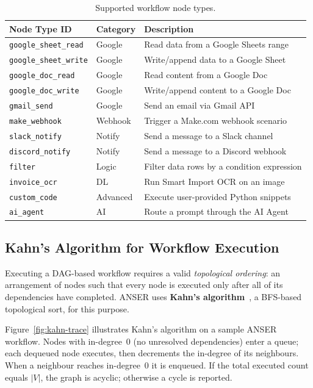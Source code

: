 \documentclass[11pt,a4paper]{report}
\begin{document}
\begin{table}[H]
\centering
\caption{Supported workflow node types.}
\label{tab:node-types}
\begin{tabular}{lll}
\toprule
\textbf{Node Type ID} & \textbf{Category} & \textbf{Description} \\
\midrule
\texttt{google\_sheet\_read}  & Google    & Read data from a Google Sheets range \\
\texttt{google\_sheet\_write} & Google    & Write/append data to a Google Sheet \\
\texttt{google\_doc\_read}    & Google    & Read content from a Google Doc \\
\texttt{google\_doc\_write}   & Google    & Write/append content to a Google Doc \\
\texttt{gmail\_send}          & Google    & Send an email via Gmail API \\
\texttt{make\_webhook}        & Webhook   & Trigger a Make.com webhook scenario \\
\texttt{slack\_notify}        & Notify    & Send a message to a Slack channel \\
\texttt{discord\_notify}      & Notify    & Send a message to a Discord webhook \\
\texttt{filter}               & Logic     & Filter data rows by a condition expression \\
\texttt{invoice\_ocr}         & DL        & Run Smart Import OCR on an image \\
\texttt{custom\_code}         & Advanced  & Execute user-provided Python snippets \\
\texttt{ai\_agent}            & AI        & Route a prompt through the AI Agent \\
\bottomrule
\end{tabular}
\end{table}

\subsection{Kahn's Algorithm for Workflow Execution}
\label{sec:kahn}

Executing a DAG-based workflow requires a valid \emph{topological ordering}: an arrangement of nodes such that every node is executed only after all of its dependencies have completed. ANSER uses \textbf{Kahn's algorithm}~\cite{kahn1962}, a BFS-based topological sort, for this purpose.

Figure~\ref{fig:kahn-trace} illustrates Kahn's algorithm on a sample ANSER workflow. Nodes with in-degree~0 (no unresolved dependencies) enter a queue; each dequeued node executes, then decrements the in-degree of its neighbours. When a neighbour reaches in-degree~0 it is enqueued. If the total executed count equals $|V|$, the graph is acyclic; otherwise a cycle is reported.
\end{document}
